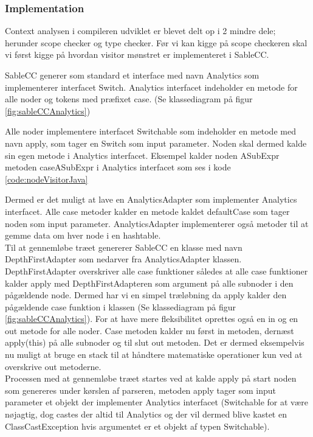 \subsubsection{Implementation}
\label{ssec:contextimple}
Context analysen i compileren udviklet er blevet delt op i 2 mindre dele; herunder scope checker og type checker. Før vi kan kigge på scope checkeren skal vi først kigge på hvordan visitor mønstret er implementeret i SableCC.

\label{sct:visitorSableCC}
SableCC generer som standard et interface med navn Analytics som implementerer interfacet Switch. Analytics interfacet indeholder en metode for alle noder og tokens med præfixet case. (Se klassediagram på figur \ref{fig:sableCCAnalytics})

\noindent Alle noder implementere interfacet Switchable som indeholder en metode med navn apply, som tager en Switch som input parameter. Noden skal dermed kalde sin egen metode i Analytics interfacet. Eksempel kalder noden ASubExpr metoden caseASubExpr i Analytics interfacet som ses i kode \ref{code:nodeVisitorJava}


\noindent Dermed er det muligt at lave en AnalyticsAdapter som implementer Analytics interfacet. Alle case metoder kalder en metode kaldet defaultCase som tager noden som input parameter. AnalyticsAdapter implementerer også metoder til at gemme data om hver node i en hashtable.\\

\noindent Til at gennemløbe træet genererer SableCC en klasse med navn DepthFirstAdapter som nedarver fra AnalyticsAdapter klassen. DepthFirstAdapter overskriver alle case funktioner således at alle case funktioner kalder apply med DepthFirstAdapteren som argument på alle subnoder i den pågældende node. Dermed har vi en simpel træløbning da apply kalder den pågældende case funktion i klassen (Se klassediagram på figur \ref{fig:sableCCAnalytics}). For at have mere fleksibilitet oprettes også en in og en out metode for alle noder. Case metoden kalder nu først in metoden, dernæst apply(this) på alle subnoder og til slut out metoden. Det er dermed eksempelvis nu muligt at bruge en stack til at håndtere matematiske operationer kun ved at overskrive out metoderne.\\

\noindent Processen med at gennemløbe træet startes ved at kalde apply på start noden som genereres under kørslen af parseren, metoden apply tager som input parameter et objekt der implementer Analytics interfacet (Switchable for at være nøjagtig, dog castes der altid til Analytics og der vil dermed blive kastet en ClassCastException hvis argumentet er et objekt af typen Switchable).

